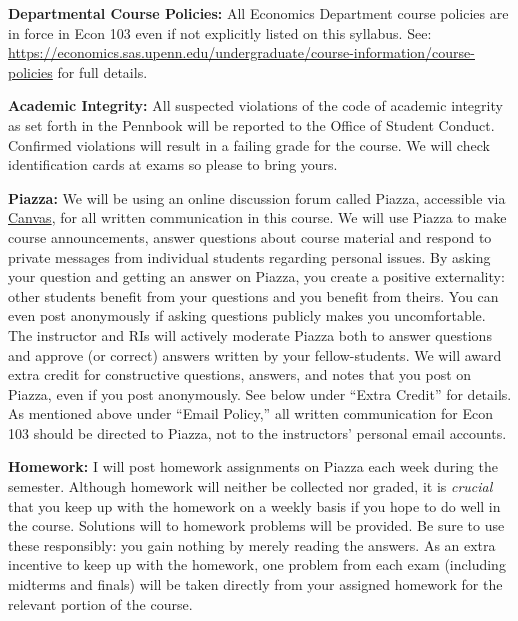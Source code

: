 \documentclass[11pt, letterpaper]{article}
\begin{document}
\newpage

\noindent \textbf{Departmental Course Policies: } 
All Economics Department course policies are in force in Econ 103 even if not explicitly listed on this syllabus. 
See: \url{https://economics.sas.upenn.edu/undergraduate/course-information/course-policies} for full details.


\bigskip


\noindent \textbf{Academic Integrity: } 
All suspected violations of the code of academic integrity as set forth in the Pennbook will be reported to the Office of Student Conduct. 
Confirmed violations will result in a failing grade for the course. 
We will check identification cards at exams so please to bring yours.

\medskip

\noindent \textbf{Piazza:} 
We will be using an online discussion forum called Piazza, accessible via \href{http://upenn.instructure.com}{Canvas}, for all written communication in this course.
We will use Piazza to make course announcements, answer questions about course material and respond to private messages from individual students regarding personal issues.
By asking your question and getting an answer on Piazza, you create a positive externality: other students benefit from your questions and you benefit from theirs.
You can even post anonymously if asking questions publicly makes you uncomfortable.
The instructor and RIs will actively moderate Piazza both to answer questions and approve (or correct) answers written by your fellow-students.
We will award extra credit for constructive questions, answers, and notes that you post on Piazza, even if you post anonymously.
See below under ``Extra Credit'' for details.
As mentioned above under ``Email Policy,'' all written communication for Econ 103 should be directed to Piazza, not to the instructors' personal email accounts.

\medskip

\noindent \textbf{Homework:} 
I will post homework assignments on Piazza each week during the semester.
Although homework will neither be collected nor graded, it is \emph{crucial} that you keep up with the homework on a weekly basis if you hope to do well in the course.
Solutions will to homework problems will be provided.
Be sure to use these responsibly: you gain nothing by merely reading the answers. 
As an extra incentive to keep up with the homework, one problem from each  exam (including midterms and finals) will be taken directly from your assigned homework for the relevant portion of the course.
\end{document}
